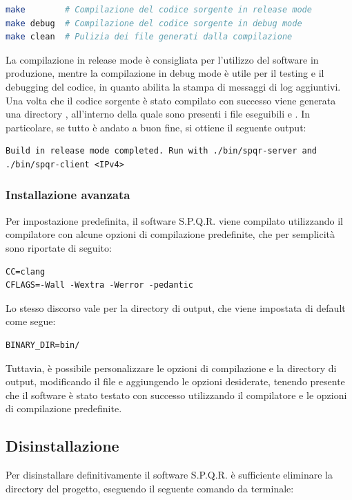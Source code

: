 \begin{lstlisting}[style=bash,language=bash,numbers=none]
make        # Compilazione del codice sorgente in release mode
make debug  # Compilazione del codice sorgente in debug mode
make clean  # Pulizia dei file generati dalla compilazione
\end{lstlisting}

La compilazione in release mode è consigliata per l'utilizzo del software in produzione, mentre la compilazione in debug mode è utile per il testing e il debugging del codice, in quanto abilita la stampa di messaggi di log aggiuntivi.
Una volta che il codice sorgente è stato compilato con successo viene generata una directory , all'interno della quale sono presenti i file eseguibili  e .
In particolare, se tutto è andato a buon fine, si ottiene il seguente output:

\begin{lstlisting}[numbers=none]
Build in release mode completed. Run with ./bin/spqr-server and ./bin/spqr-client <IPv4>
\end{lstlisting}

\subsubsection{Installazione avanzata}
Per impostazione predefinita, il software S.P.Q.R. viene compilato utilizzando il compilatore  con alcune opzioni di compilazione predefinite, che per semplicità sono riportate di seguito:

\begin{lstlisting}[numbers=none]
CC=clang
CFLAGS=-Wall -Wextra -Werror -pedantic
\end{lstlisting}

Lo stesso discorso vale per la directory di output, che viene impostata di default come segue:

\begin{lstlisting}[numbers=none]
BINARY_DIR=bin/
\end{lstlisting}

Tuttavia, è possibile personalizzare le opzioni di compilazione e la directory di output, modificando il file  e aggiungendo le opzioni desiderate, tenendo presente che il software è stato testato con successo utilizzando il compilatore  e le opzioni di compilazione predefinite.

\subsection{Disinstallazione}
Per disinstallare definitivamente il software S.P.Q.R. è sufficiente eliminare la directory del progetto, eseguendo il seguente comando da terminale:

